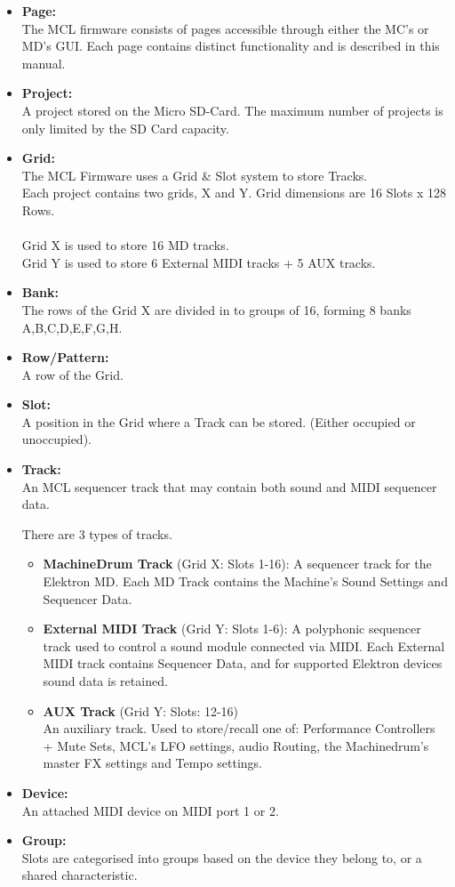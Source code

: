 \begin{itemize}
\item \textbf{Page:}
\\
The MCL firmware consists of pages accessible through either the MC's or MD's GUI. Each page contains distinct functionality and is described in this manual.
\item \textbf{Project:}
\\
A project stored on the Micro SD-Card.
The maximum number of projects is only limited by the SD Card capacity.

\item \textbf{Grid:}
\\
The MCL Firmware uses a Grid \& Slot system to store Tracks.\\
Each project contains two grids, X and Y. Grid dimensions are 16 Slots x 128 Rows.\\
\\
Grid X is used to store 16 MD tracks.\\Grid Y is used to store 6 External MIDI tracks + 5 AUX tracks.
\item \textbf{Bank:}\\
The rows of the Grid X are divided in to groups of 16, forming 8 banks A,B,C,D,E,F,G,H.
\item \textbf{Row/Pattern:}
\\
A row of the Grid.

\item \textbf{Slot:}
\\
A position in the Grid where a Track can be stored. (Either occupied or unoccupied).
\item \textbf{Track:}
\\
An MCL sequencer track that may contain both sound and MIDI sequencer data.

There are 3 types of tracks.
\begin{itemize}

\item \textbf{MachineDrum Track} (Grid X: Slots 1-16):
A sequencer track for the Elektron MD. Each MD Track contains the Machine's Sound Settings and Sequencer Data.

\item \textbf{External MIDI Track} (Grid Y: Slots 1-6):
A polyphonic sequencer track used to control a sound module connected via MIDI. Each External MIDI track contains Sequencer Data, and for supported Elektron devices sound data is retained. 

\item \textbf{AUX Track} (Grid Y: Slots: 12-16)\\
An auxiliary track. Used to store/recall one of: Performance Controllers + Mute Sets, MCL's LFO settings, audio Routing,  the Machinedrum's master FX settings and Tempo settings.
\end{itemize}

\item \textbf{Device:}\\
An attached MIDI device on MIDI port 1 or 2.
\item \textbf{Group:}
\\
Slots are categorised into groups based on the device they belong to, or a shared characteristic.
\end{itemize}